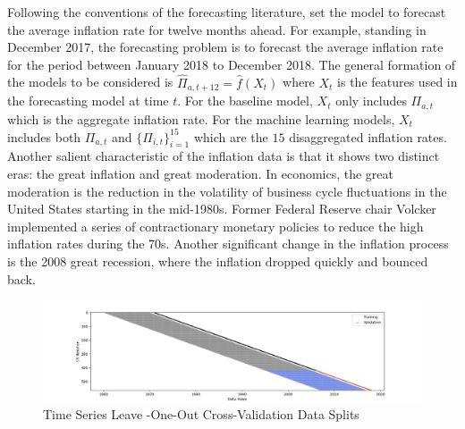 \documentclass[10pt,twocolumn,letterpaper]{article}
\begin{document}
Following the conventions of the forecasting literature, set the model to forecast the average inflation rate for twelve months ahead. For example, standing in December 2017, the forecasting problem is to forecast the average inflation rate for the period between January 2018 to December 2018. The general formation of the models to be considered is $\hat \Pi_{a, t+12} = \hat f(X_{t})$ where $X_{t}$ is the features used in the forecasting model at time $t$. For the baseline model, $X_{t}$ only includes $\Pi_{a, t}$ which \noindent is the aggregate inflation rate. For the machine learning models, $X_{t}$ includes both  $\Pi_{a, t}$ and $\{\Pi_{i ,t}\}_{i = 1}^{15}$ which are the $15$ disaggregated inflation rates. 
Another salient characteristic of the inflation data is that it shows two distinct eras: the great inflation and great moderation. In economics, the great moderation is the reduction in the volatility of business cycle fluctuations in the United States starting in the mid-1980s. Former Federal Reserve chair Volcker implemented a series of contractionary monetary policies to reduce the high inflation rates during the 70s. Another significant change in the inflation process is the 2008 great recession, where the inflation dropped quickly and bounced back. 

\begin{figure}[t]
\begin{center}
\includegraphics[scale=0.5]{../../Python/TimeSeriesSplit.png}
\caption{Time Series Leave -One-Out Cross-Validation Data Splits}
\end{center}
\end{figure}
\end{document}
